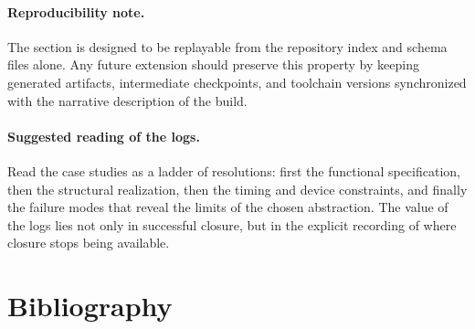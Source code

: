 \documentclass[11pt]{article}
\begin{document}
\paragraph{Reproducibility note.} The section is designed to be replayable from the repository index and schema files alone. Any future extension should preserve this property by keeping generated artifacts, intermediate checkpoints, and toolchain versions synchronized with the narrative description of the build.

\paragraph{Suggested reading of the logs.} Read the case studies as a ladder of resolutions: first the functional specification, then the structural realization, then the timing and device constraints, and finally the failure modes that reveal the limits of the chosen abstraction. The value of the logs lies not only in successful closure, but in the explicit recording of where closure stops being available.



\section{Bibliography}

\end{document}
